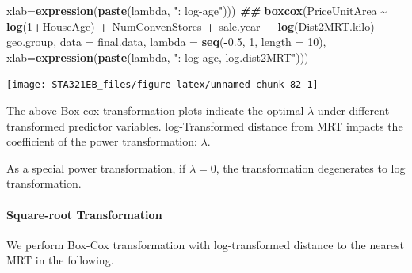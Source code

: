 \documentclass[
]{book}
\newenvironment{Shaded}{\begin{snugshade}}{\end{snugshade}}
\newcommand{\AttributeTok}[1]{\textcolor[rgb]{0.13,0.29,0.53}{#1}}
\newcommand{\DecValTok}[1]{\textcolor[rgb]{0.00,0.00,0.81}{#1}}
\newcommand{\DocumentationTok}[1]{\textcolor[rgb]{0.56,0.35,0.01}{\textbf{\textit{#1}}}}
\newcommand{\FloatTok}[1]{\textcolor[rgb]{0.00,0.00,0.81}{#1}}
\newcommand{\FunctionTok}[1]{\textcolor[rgb]{0.13,0.29,0.53}{\textbf{#1}}}
\newcommand{\NormalTok}[1]{#1}
\newcommand{\OtherTok}[1]{\textcolor[rgb]{0.56,0.35,0.01}{#1}}
\newcommand{\SpecialCharTok}[1]{\textcolor[rgb]{0.81,0.36,0.00}{\textbf{#1}}}
\newcommand{\StringTok}[1]{\textcolor[rgb]{0.31,0.60,0.02}{#1}}
\begin{document}
\begin{Shaded}
\begin{Highlighting}[]
       \AttributeTok{xlab=}\FunctionTok{expression}\NormalTok{(}\FunctionTok{paste}\NormalTok{(lambda, }\StringTok{": log{-}age"}\NormalTok{)))}
\DocumentationTok{\#\#}
\FunctionTok{boxcox}\NormalTok{(PriceUnitArea }\SpecialCharTok{\textasciitilde{}} \FunctionTok{log}\NormalTok{(}\DecValTok{1}\SpecialCharTok{+}\NormalTok{HouseAge) }\SpecialCharTok{+}\NormalTok{ NumConvenStores }\SpecialCharTok{+}\NormalTok{ sale.year }\SpecialCharTok{+}  \FunctionTok{log}\NormalTok{(Dist2MRT.kilo)  }\SpecialCharTok{+} 
\NormalTok{      geo.group, }\AttributeTok{data =}\NormalTok{ final.data, }\AttributeTok{lambda =} \FunctionTok{seq}\NormalTok{(}\SpecialCharTok{{-}}\FloatTok{0.5}\NormalTok{, }\DecValTok{1}\NormalTok{, }\AttributeTok{length =} \DecValTok{10}\NormalTok{), }
      \AttributeTok{xlab=}\FunctionTok{expression}\NormalTok{(}\FunctionTok{paste}\NormalTok{(lambda, }\StringTok{": log{-}age, log.dist2MRT"}\NormalTok{)))}
\end{Highlighting}
\end{Shaded}

\begin{center}\texttt{[image: STA321EB\_files/figure-latex/unnamed-chunk-82-1]} \end{center}

The above Box-cox transformation plots indicate the optimal \(\lambda\) under different transformed predictor variables. log-Transformed distance from MRT impacts the coefficient of the power transformation: \(\lambda\).

As a special power transformation, if \(\lambda = 0\), the transformation degenerates to log transformation.

\hypertarget{square-root-transformation}{%
\paragraph{Square-root Transformation}\label{square-root-transformation}}

We perform Box-Cox transformation with log-transformed distance to the nearest MRT in the following.

\begin{Shaded}
\end{Shaded}
\end{document}
